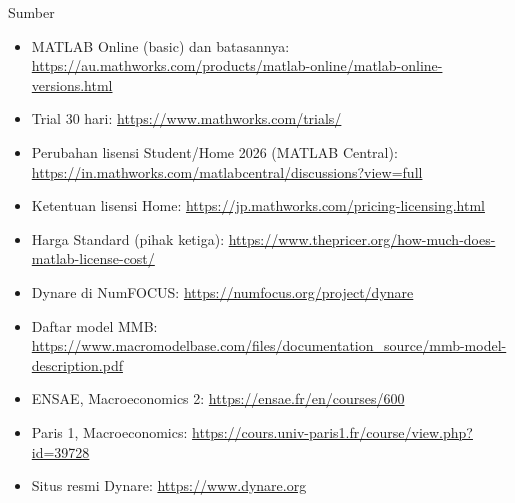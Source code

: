 \documentclass[aspectratio=169,11pt]{beamer}
\begin{document}
\begin{frame}{Sumber}
\scriptsize
\begin{itemize}
  \item MATLAB Online (basic) dan batasannya:
        \url{https://au.mathworks.com/products/matlab-online/matlab-online-versions.html}
  \item Trial 30 hari: \url{https://www.mathworks.com/trials/}
  \item Perubahan lisensi Student/Home 2026 (MATLAB Central):
        \url{https://in.mathworks.com/matlabcentral/discussions?view=full}
  \item Ketentuan lisensi Home: \url{https://jp.mathworks.com/pricing-licensing.html}
  \item Harga Standard (pihak ketiga): \url{https://www.thepricer.org/how-much-does-matlab-license-cost/}
  \item Dynare di NumFOCUS: \url{https://numfocus.org/project/dynare}
  \item Daftar model MMB: \url{https://www.macromodelbase.com/files/documentation_source/mmb-model-description.pdf}
  \item ENSAE, Macroeconomics 2: \url{https://ensae.fr/en/courses/600}
  \item Paris 1, Macroeconomics: \url{https://cours.univ-paris1.fr/course/view.php?id=39728}
  \item Situs resmi Dynare: \url{https://www.dynare.org}
\end{itemize}
\end{frame}
\end{document}
